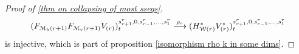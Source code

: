\documentclass[11pt]{amsart}
\theoremstyle{plain}
\theoremstyle{definition}
\renewcommand{\to}{\longrightarrow}
\newcommand{\calW}{\mathcal{W}}
\newcommand{\calV}{\mathcal{V}}
\newcommand{\calM}{\mathcal{M}}
\newcommand{\calMv}{\mathcal{M}_\textup{v}}
\newcommand{\calMh}{\mathcal{M}_\textup{h}}
\theoremstyle{plain}
\newcommand{\vect}[2]{\calV^{#1}_{#2}}
\newcommand{\UEAX}{\overline{X}'}%
\newcommand{\Sqh}{\mathrm{Sq}_\textup{h}}
\begin{document}
\begin{Calculations of HWn for n nonzero}
\begin{proof}[Proof of \ref{thm on collapsing of most sseqs}]
\[(F_{\calM_{\textup{h}}(r+1)}F_{\calM_{\textup{v}}(r+1)}V_{(r)})^{s_{r+1}^{r},0,s_{r-1}^{r},\ldots,s_1^{r}}_{t} \overset{\rho_r}{\to}(H^*_{\calW(r)}V^*_{(r)})^{s_{r+1}^{r},0,s_{r-1}^{r},\ldots,s_1^{r}}_{t}\]
is injective, which is part of proposition \ref{isomorphism rho k in some dims}.
%
\end{proof}

\end{Calculations of HWn for n nonzero}
\end{document}
